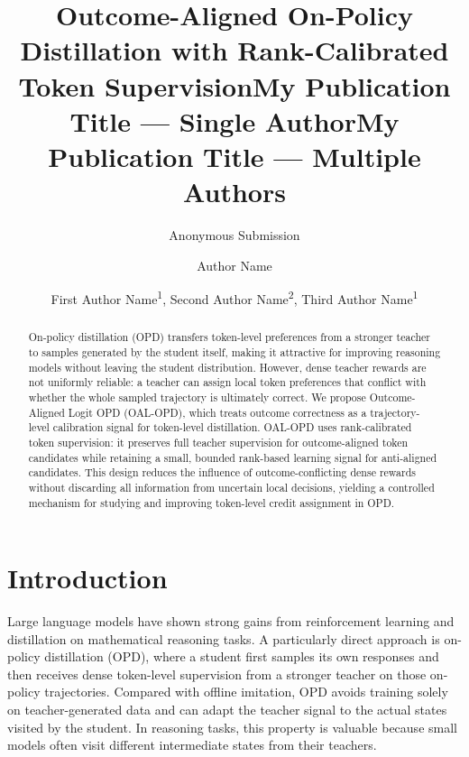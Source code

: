 \documentclass[letterpaper]{article} %
\title{Outcome-Aligned On-Policy Distillation with Rank-Calibrated Token Supervision}
\author{
    Anonymous Submission
}
\title{My Publication Title --- Single Author}
\author {
    Author Name
}
\title{My Publication Title --- Multiple Authors}
\author {
    First Author Name\textsuperscript{\rm 1},
    Second Author Name\textsuperscript{\rm 2},
    Third Author Name\textsuperscript{\rm 1}
}
\begin{document}
\maketitle

\begin{abstract}
On-policy distillation (OPD) transfers token-level preferences from a stronger teacher to samples generated by the student itself, making it attractive for improving reasoning models without leaving the student distribution. However, dense teacher rewards are not uniformly reliable: a teacher can assign local token preferences that conflict with whether the whole sampled trajectory is ultimately correct. We propose Outcome-Aligned Logit OPD (OAL-OPD), which treats outcome correctness as a trajectory-level calibration signal for token-level distillation. OAL-OPD uses rank-calibrated token supervision: it preserves full teacher supervision for outcome-aligned token candidates while retaining a small, bounded rank-based learning signal for anti-aligned candidates. This design reduces the influence of outcome-conflicting dense rewards without discarding all information from uncertain local decisions, yielding a controlled mechanism for studying and improving token-level credit assignment in OPD.
\end{abstract}


\section{Introduction}

Large language models have shown strong gains from reinforcement learning and distillation on mathematical reasoning tasks. A particularly direct approach is on-policy distillation (OPD), where a student first samples its own responses and then receives dense token-level supervision from a stronger teacher on those on-policy trajectories. Compared with offline imitation, OPD avoids training solely on teacher-generated data and can adapt the teacher signal to the actual states visited by the student. In reasoning tasks, this property is valuable because small models often visit different intermediate states from their teachers.
\end{document}
